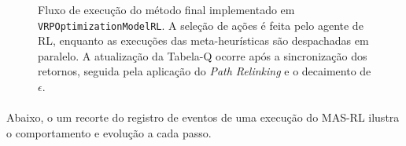\begin{figure}[H]
    \caption[ \small{Fluxograma do MAS-RL}]{\label{FigFluxFinalMASRL} \small{Fluxo de execução do método final implementado em \texttt{VRPOptimizationModelRL}. A seleção de ações é feita pelo agente de RL, enquanto as execuções das meta-heurísticas são despachadas em paralelo. A atualização da Tabela-Q ocorre após a sincronização dos retornos, seguida pela aplicação do \textit{Path Relinking} e o decaimento de $\epsilon$.}}
\end{figure}
\vspace{-0.5cm}

\paragraph{} Abaixo, o um recorte do registro de eventos de uma execução do MAS-RL ilustra o comportamento e evolução a cada passo.


